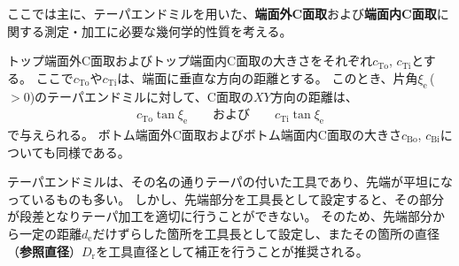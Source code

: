 

ここでは主に、テーパエンドミルを用いた、\textbf{端面外C面取}および\textbf{端面内C面取}に関する測定・加工に必要な幾何学的性質を考える。



トップ端面外C面取およびトップ端面内C面取の大きさをそれぞれ$c_\mathrm{To}$, $c_\mathrm{Ti}$とする。
ここで$c_\mathrm{To}$や$c_\mathrm{Ti}$は、端面に垂直な方向の距離とする。
このとき、片角$\xi_\mathrm e$\,($>0$)のテーパエンドミルに対して、C面取の$XY$方向の距離は、
\begin{align*}
  c_\mathrm{To}\tan\xi_\mathrm e\qquad\text{および}\qquad c_\mathrm{Ti}\tan\xi_\mathrm e
\end{align*}
で与えられる。
ボトム端面外C面取およびボトム端面内C面取の大きさ$c_\mathrm{Bo}$, $c_\mathrm{Bi}$についても同様である。



テーパエンドミルは、その名の通りテーパの付いた工具であり、先端が平坦になっているものも多い。
しかし、先端部分を工具長として設定すると、その部分が段差となりテーパ加工を適切に行うことができない。
そのため、先端部分から一定の距離$d_\mathrm e$だけずらした箇所を工具長として設定し、またその箇所の直径（\textbf{参照直径}）$D_\mathrm r$を工具直径として補正を行うことが推奨される。

